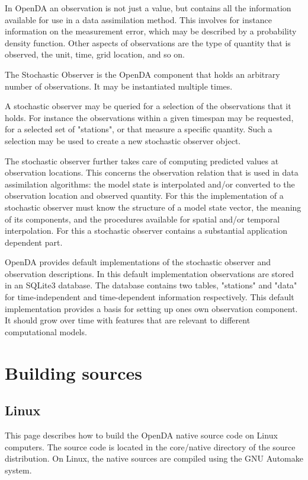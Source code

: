 In OpenDA an observation is not just a value, but contains all the information available for use in a data assimilation method. This involves for instance information on the measurement error, which may be described by a probability density function. Other aspects of observations are the type of quantity that is observed, the unit, time, grid location, and so on.

The Stochastic Observer is the OpenDA component that holds an arbitrary number of observations. It may be instantiated multiple times.

A stochastic observer may be queried for a selection of the observations that it holds. For instance the observations within a given timespan may be requested, for a selected set of "stations", or that measure a specific quantity. Such a selection may be used to create a new stochastic observer object.

The stochastic observer further takes care of computing predicted values at observation locations. This concerns the observation relation that is used in data assimilation algorithms: the model state is interpolated and/or converted to the observation location and observed quantity. For this the implementation of a stochastic observer must know the structure of a model state vector, the meaning of its components, and the procedures available for spatial and/or temporal interpolation. For this a stochastic observer contains a substantial application dependent part.

OpenDA provides default implementations of the stochastic observer and observation descriptions. In this default implementation observations are stored in an SQLite3 database. The database contains two tables, "stations" and "data" for time-independent and time-dependent information respectively. This default implementation provides a basis for setting up ones own observation component. It should grow over time with features that are relevant to different computational models. 

\section{Building sources}

\subsection{Linux}

This page describes how to build the OpenDA native source code on Linux computers. The source code is located in the core/native directory of the source distribution. On Linux, the native sources are compiled using the GNU Automake system.

